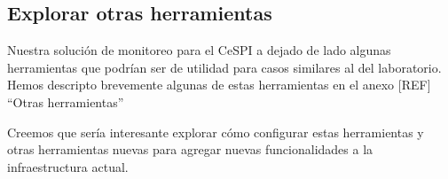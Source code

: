 \subsection{Explorar otras herramientas}
\label{explorar-otras-herramientas}

Nuestra solución de monitoreo para el CeSPI a dejado de lado algunas herramientas que podrían ser de utilidad para casos similares al del laboratorio. Hemos descripto brevemente algunas de estas herramientas en el anexo [REF] “Otras herramientas”

Creemos que sería interesante explorar cómo configurar estas herramientas y otras herramientas nuevas para agregar nuevas funcionalidades a la infraestructura actual.
